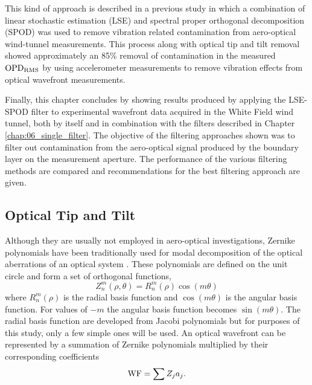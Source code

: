 This kind of approach is described in a previous study \cite{DeLucca-2014-RAJvGdv7} in which a combination of linear stochastic estimation (LSE) and spectral proper orthogonal decomposition (SPOD) was used to remove vibration related contamination from aero-optical wind-tunnel measurements.
This process along with optical tip and tilt removal showed approximately an 85\% removal of contamination in the measured $\operatorname{OPD_{RMS}}$ by using accelerometer measurements to remove vibration effects from optical wavefront measurements.

Finally, this chapter concludes by showing results produced by applying the LSE-SPOD filter to experimental wavefront data acquired in the White Field wind tunnel, both by itself and in combination with the filters described in Chapter \ref{chap:06_single_filter}. The objective of the filtering approaches shown was to filter out contamination from the aero-optical signal produced by the boundary layer on the measurement aperture. The performance of the various filtering methods are compared and recommendations for the best filtering approach are given.

\subsection{Optical Tip and Tilt}
Although they are usually not employed in aero-optical investigations, Zernike polynomials have been traditionally used for modal decomposition of the optical aberrations of an optical system \cite{Born-1965-HHGYgjdH}.
These polynomials are defined on the unit circle and form a set of orthogonal functions,
\begin{equation}
  Z_n^m(\rho,\theta) = R_n^m(\rho)\cos(m\theta)
  \label{eqn:07_zernike}
\end{equation}
where $R_n^m(\rho)$ is the radial basis function and $\cos(m\theta)$ is the angular basis function.
For values of $-m$ the angular basis function becomes $\sin(m\theta)$.
The radial basis function are developed from Jacobi polynomials but for purposes of this study, only a few simple ones will be used.
An optical wavefront can be represented by a summation of Zernike polynomials multiplied by their corresponding coefficients
\begin{equation}
  \operatorname{WF} = \sum Z_ja_j \textrm{.}
  \label{eqn:07_zernike_coeff}
\end{equation}


